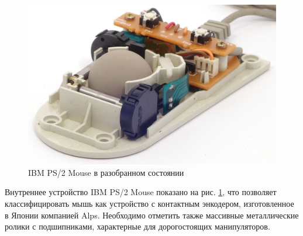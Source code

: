 \documentclass[11pt, a4paper]{article}
\begin{document}
\begin{figure}[h]
    \centering
    \includegraphics[scale=0.7]{1987_ibm_ps2_mouse/razob1.jpg} 
    \caption{IBM PS/2 Mouse в разобранном состоянии}
    \label{fig:IBMPS2Inside}
\end{figure}

Внутреннее устройство IBM PS/2 Mouse показано на рис. \ref{fig:IBMPS2Inside}, что позволяет классифицировать мышь как устройство с контактным энкодером, изготовленное в Японии компанией Alps. Необходимо отметить также массивные металлические ролики с подшипниками, характерные для дорогостоящих манипуляторов.
\end{document}
